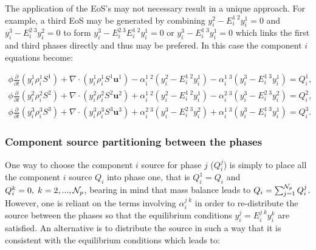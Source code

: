 The application of the EoS's may not necessary result in a unique 
approach. For example, a third EoS may be generated by 
combining $y_i^2 - E_i^{1\;2} y_i^1=0$ and 
$y_i^3 - E_i^{2\;3} y_i^2= 0$ to form $y_i^3 - E_i^{2\;3} E_i^{1\;2} y_i^1= 0$ 
or $y_i^3 - E_i^{1\;3}y_i^1= 0$ which links the first and third phases 
directly and thus may be prefered. In this case the component $i$ equations become: 

\begin{eqnarray}
\phi  \displaystyle\frac{\partial}{\partial t}\left(y_{i}^{1}\rho_i^{1}S^{1} \right) +
\nabla\cdot\left(y_{i}^{1}\rho_i^{1}S^{1}\mathbf{u}^{1}  \right) - \alpha_i^{1\;2} (y_i^2 - E_i^{1\;2} y_i^1) 
- \alpha_i^{1\;3} (y_i^3 - E_i^{1\;3} y_i^1) = Q_i^1 ,
\label{phase1-comp-i'}
\end{eqnarray}
\begin{eqnarray}
\phi \displaystyle\frac{\partial}{\partial t}\left(y_{i}^{2}\rho_i^{2}S^{2}  \right) + 
 \nabla\cdot\left( y_{i}^{2}\rho_i^{2}S^{2}\mathbf{u}^{2}  \right) + \alpha_i^{1\;2} (y_i^2 - E_i^{1\;2} y_i^1)   - \alpha_i^{2\;3} (y_i^3 - E_i^{2\;3} y_i^2) = Q_i^2 ,
\label{phase2-comp-i'}
\end{eqnarray}
\begin{eqnarray}
\phi \displaystyle\frac{\partial}{\partial t}\left(y_{i}^{3}\rho_i^{3}S^{3}  \right) + 
 \nabla\cdot\left( y_{i}^{3}\rho_i^{3}S^{3}\mathbf{u}^{3}  \right) +  \alpha_i^{2\;3} (y_i^3 - E_i^{2\;3} y_i^2) 
 + \alpha_i^{1\;3} (y_i^3 - E_i^{1\;3} y_i^1)= Q_i^3  . 
\label{phase3-comp-i'}
\end{eqnarray}



\subsubsection{Component source partitioning between the phases} 
\label{Component phase source partitioning} 
One way to choose 
the component $i$ source for phase $j$ ($Q_i^j$) is simply 
to place all the component $i$ source $Q_i$ into phase one, 
that is $Q_i^1=Q_i$ and  $Q_i^k=0, \; k=2,...,{\cal N}_p$, 
bearing in mind that mass balance 
leads to  $Q_i=\sum_{j=1}^{{\cal N}_p} Q_i^j$. 
However, one is reliant on the terms involving 
$\alpha_i^{j\;k}$ in order to re-distribute the 
source between the phases so that the equilibrium conditions 
$y_i^j=E_i^{j\;k} y_i^k$ are satisfied. 
An alternative is to distribute the source in such a way that 
it is consistent with the equilibrium conditions which leads to:

